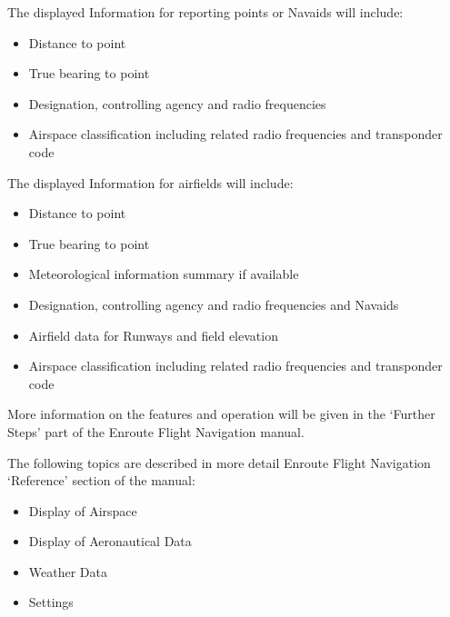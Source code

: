 \documentclass[letterpaper,10pt,english]{sphinxmanual}
\begin{document}
The displayed Information for reporting points or Navaids will include:
\begin{itemize}
\item {} 
Distance to point

\item {} 
True bearing to point

\item {} 
Designation, controlling agency and radio frequencies

\item {} 
Airspace classification including related radio frequencies and transponder code

\end{itemize}

The displayed Information for airfields will include:
\begin{itemize}
\item {} 
Distance to point

\item {} 
True bearing to point

\item {} 
Meteorological information summary if available

\item {} 
Designation, controlling agency and radio frequencies and Navaids

\item {} 
Airfield data for Runways and field elevation

\item {} 
Airspace classification including related radio frequencies and transponder code

\end{itemize}

More information on the features and operation will be given in the ‘Further Steps’ part of the Enroute Flight Navigation manual.

The following topics are described in more detail Enroute Flight Navigation ‘Reference’ section of the manual:
\begin{itemize}
\item {} 
Display of Airspace

\item {} 
Display of Aeronautical Data

\item {} 
Weather Data

\item {} 
Settings

\end{itemize}
\end{document}
